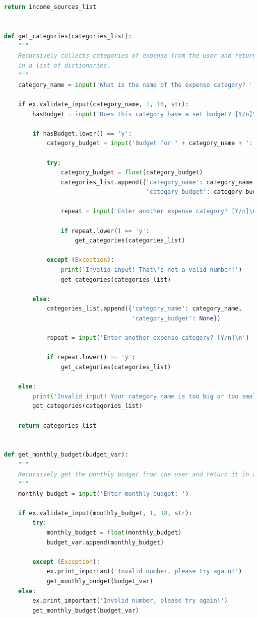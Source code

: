 \documentclass[11pt]{article}
\begin{document}
\begin{lstlisting}[language=Python, caption=Source code for \textit{expcli.py}.]
    return income_sources_list


def get_categories(categories_list):
    """
    Recursively collects categories of expense from the user and returns them
    in a list of dictionaries.
    """
    category_name = input('What is the name of the expense category? ')

    if ex.validate_input(category_name, 1, 16, str):
        hasBudget = input('Does this category have a set budget? [Y/n]\n')

        if hasBudget.lower() == 'y':
            category_budget = input('Budget for ' + category_name + ': ')

            try:
                category_budget = float(category_budget)
                categories_list.append({'category_name': category_name,
                                        'category_budget': category_budget})

                repeat = input('Enter another expense category? [Y/n]\n')

                if repeat.lower() == 'y':
                    get_categories(categories_list)

            except (Exception):
                print('Invalid input! That\'s not a valid number!')
                get_categories(categories_list)

        else:
            categories_list.append({'category_name': category_name,
                                    'category_budget': None})

            repeat = input('Enter another expense category? [Y/n]\n')

            if repeat.lower() == 'y':
                get_categories(categories_list)

    else:
        print('Invalid input! Your category name is too big or too small!')
        get_categories(categories_list)

    return categories_list


def get_monthly_budget(budget_var):
    """
    Recursively get the monthly budget from the user and return it in an array.
    """
    monthly_budget = input('Enter monthly budget: ')

    if ex.validate_input(monthly_budget, 1, 18, str):
        try:
            monthly_budget = float(monthly_budget)
            budget_var.append(monthly_budget)

        except (Exception):
            ex.print_important('Invalid number, please try again!')
            get_monthly_budget(budget_var)
    else:
        ex.print_important('Invalid number, please try again!')
        get_monthly_budget(budget_var)


\end{lstlisting}
\end{document}

